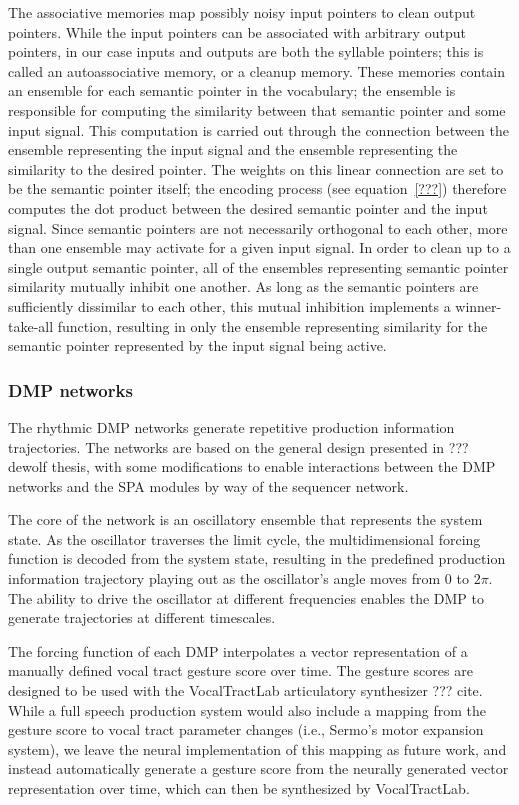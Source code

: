 The associative memories
map possibly noisy input pointers
to clean output pointers.
While the input pointers
can be associated with arbitrary
output pointers,
in our case inputs and outputs
are both the syllable pointers;
this is called an autoassociative memory,
or a cleanup memory.
These memories contain an ensemble
for each semantic pointer
in the vocabulary;
the ensemble is responsible for computing
the similarity between
that semantic pointer
and some input signal.
This computation is carried out
through the connection between
the ensemble representing the input signal
and the ensemble representing
the similarity to the desired pointer.
The weights on this linear connection
are set to be the semantic pointer itself;
the encoding process (see equation~\eqref{???})
therefore computes the dot product
between the desired semantic pointer
and the input signal.
Since semantic pointers are not necessarily
orthogonal to each other,
more than one ensemble may activate
for a given input signal.
In order to clean up to a single
output semantic pointer,
all of the ensembles
representing semantic pointer similarity
mutually inhibit one another.
As long as the semantic pointers
are sufficiently dissimilar
to each other,
this mutual inhibition
implements a winner-take-all function,
resulting in only the ensemble
representing similarity for the
semantic pointer represented by
the input signal being active.

\subsubsection{DMP networks}

The rhythmic DMP networks
generate repetitive
production information trajectories.
The networks are based on
the general design
presented in ??? dewolf thesis,
with some modifications
to enable interactions between
the DMP networks
and the SPA modules
by way of the sequencer network.

The core of the network
is an oscillatory ensemble
that represents the system state.
As the oscillator traverses
the limit cycle,
the multidimensional forcing function
is decoded from the system state,
resulting in the predefined
production information trajectory
playing out as
the oscillator's angle moves from $0$ to $2\pi$.
The ability to drive the oscillator
at different frequencies
enables the DMP to generate trajectories
at different timescales.

The forcing function of each DMP
interpolates a vector representation of
a manually defined
vocal tract gesture score over time.
The gesture scores are
designed to be used with the VocalTractLab
articulatory synthesizer ??? cite.
While a full speech production system
would also include a mapping from
the gesture score to
vocal tract parameter changes
(i.e., Sermo's motor expansion system),
we leave the neural implementation
of this mapping as future work,
and instead automatically generate
a gesture score from the neurally generated
vector representation over time,
which can then be synthesized
by VocalTractLab.

